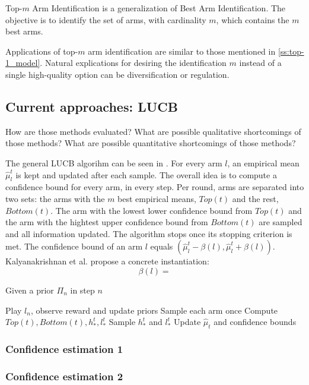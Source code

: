 Top-$m$ Arm Identification is a generalization of Best Arm Identification. The objective is to identify the set of arms, with cardinality $m$, which contains the $m$ best arms.

Applications of top-$m$ arm identification are similar to those mentioned in \ref{ss:top-1_model}. Natural explications for desiring the identification $m$ instead of a single high-quality option can be diversification or regulation.

\subsection{Current approaches: LUCB}
How are those methods evaluated?
What are possible qualitative shortcomings of those methods?
What are possible quantitative shortcomings of those methods?

The general LUCB algorihm can be seen in . For every arm $l$, an empirical mean $\hat{\mu}_l^t$ is kept and updated after each sample. The overall idea is to compute a confidence bound for every arm, in every step. Per round, arms are separated into two sets: the arms with the $m$ best empirical means, $Top(t)$ and the rest, $Bottom(t)$. The arm with the lowest lower confidence bound from $Top(t)$ and the arm with the hightest upper confidence bound from $Bottom(t)$ are sampled and all information updated.
The algorithm stops once its stopping criterion is met. The confidence bound of an arm $l$ equals $(\hat{\mu}_l^t - \beta(l), \hat{\mu}_l^t + \beta(l))$.
Kalyanakrishnan et al. \cite{DBLP:conf/icml/KalyanakrishnanTAS12} propose a concrete instantiation:
\[\beta(l) = \]

\begin{algorithm}[H]
    \caption{Given a prior $\Pi_n$ in step $n$}
    \label{alg:LUCB1}
  \begin{algorithmic}
    \State Play $l_n$, observe reward and update priors
    \State Sample each arm once
    \Repeat
      \State Compute $Top(t), Bottom(t), h_*^t, l_*^t$
      \State Sample $h_*^t$ and $l_*^t$
      \State Update $\hat{\mu}_t$ and confidence bounds
    \Until{$ \mu < \epsilon$}
  \end{algorithmic}
\end{algorithm}


\subsubsection{Confidence estimation 1}
\subsubsection{Confidence estimation 2}
